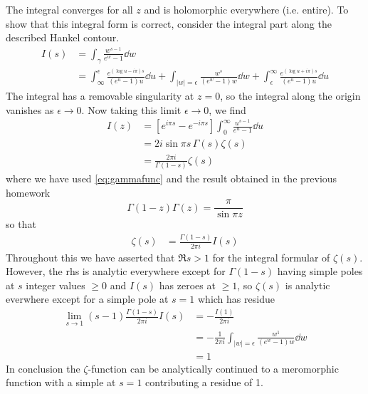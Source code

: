 \documentclass[a4paper,12pt]{article}
\begin{document}
The integral converges for all $z$ and is holomorphic everywhere (i.e. entire).
To show that this integral form is correct, consider the integral part along the described Hankel contour.
\begin{equation}
	\begin{aligned}
		I(s)&=\int_\gamma \frac{w^{s-1}}{e^{w}-1} \dd w\\
		&=\int_{\infty}^{\epsilon}\frac{e^{(\log u-i\pi)s}}{(e^{u}-1)u} \dd u+
		\int_{|w|=\epsilon} \frac{w^{s}}{(e^{w}-1)w} \dd w+\int^{\infty}_{\epsilon}\frac{e^{(\log u+i\pi)s}}{(e^{u}-1)u} \dd u
	\end{aligned}
\end{equation}
The integral has a removable singularity at $z=0$, so the integral along the origin vanishes as $\epsilon\to 0$. Now taking this limit $\epsilon\to 0$, we find
\begin{equation}
	\begin{aligned}
		I(z)&=\left[e^{i\pi s}-e^{-i\pi s}\right]\int_0^\infty \frac{u^{s-1}}{e^{u}-1}\dd u\\
		&=2i\sin \pi s\, \Gamma(s)\zeta(s)\\
		&=\frac{2\pi i}{\Gamma(1-s)}\zeta(s)
	\end{aligned}
\end{equation}
where we have used \eqref{eq:gammafunc} and the result obtained in the previous homework
\begin{equation}
\Gamma(1-z)\Gamma(z)=\frac{\pi}{\sin \pi z}
\end{equation}
so that
\begin{equation}
	\begin{aligned}
		\zeta(s)&=\frac{\Gamma(1-s)}{2\pi i}I(s)
	\end{aligned}
\end{equation}
Throughout this we have asserted that $\Re s >1$ for the integral formular of $\zeta(s)$. However, the rhs is analytic everywhere except for $\Gamma(1-s)$ having simple poles at $s$ integer values $\geq0$ and $I(s)$ has zeroes at $\geq1$, so $\zeta(s)$ is analytic everwhere except for a simple pole at $s=1$ which has residue
\begin{equation}
	\begin{aligned}
		\lim_{s\to 1}(s-1)\frac{\Gamma(1-s)}{2\pi i}I(s)&=-\frac{I(1)}{2\pi i}\\
		&=-\frac{1}{2\pi i}		\int_{|w|=\epsilon} \frac{w^{1}}{(e^{w}-1)w} \dd w\\
		&=1
	\end{aligned}
\end{equation}
In conclusion the $\zeta$-function can be analytically continued to a meromorphic function with a simple at $s=1$ contributing a residue of 1.
\end{document}
